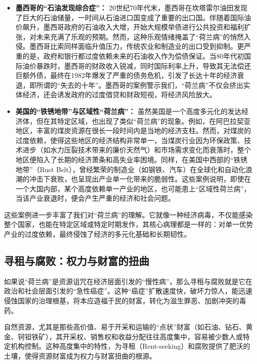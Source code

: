 \begin{itemize}
    \item \textbf{墨西哥的“石油发现综合症”：} 20世纪70年代末，墨西哥在坎塔雷尔油田发现了巨大的石油储量，一时间从石油进口国变成了重要的出口国。伴随着国际油价飙升，墨西哥政府的石油收入大增，开始大规模举债进行公共投资和福利扩张，对未来充满了乐观的预期。然而，这种乐观情绪掩盖了“荷兰病”的悄然入侵。墨西哥比索同样面临升值压力，传统农业和制造业的出口受到抑制。更严重的是，政府和银行都过度依赖未来的石油收入作为偿债保证。当80年代初国际油价暴跌时，墨西哥的财政收入锐减，同时国际利率上升，导致其无法偿还巨额外债，最终在1982年爆发了严重的债务危机，引发了长达十年的经济衰退，即所谓的“失去的十年”。墨西哥的案例警示我们，“荷兰病”不仅会挤出实体经济，还会诱发政府的过度借贷和财政短视，将经济风险放大。
    \item \textbf{美国的“铁锈地带”与区域性“荷兰病”：} 虽然美国是一个高度多元化的发达经济体，但在其特定区域，也出现了类似“荷兰病”的现象。例如，在阿巴拉契亚地区，丰富的煤炭资源在很长一段时间内是当地的经济支柱。然而，对煤炭的过度依赖，使得这些地区的经济结构非常单一，当煤炭行业因为环保政策、技术进步（如水力压裂技术带来的廉价天然气）和市场需求变化而衰落时，整个地区便陷入了长期的经济萧条和高失业率困境。同样，在美国中西部的“铁锈地带”（Rust Belt），曾经繁荣的制造业（如钢铁、汽车）在全球化和自动化浪潮的冲击下衰败，也呈现出产业单一化带来的脆弱性。这些案例说明，即使在一个大国内部，某个高度依赖单一产业的地区，也可能患上“区域性荷兰病”，当该产业衰退时，便会产生严重的经济和社会问题。
\end{itemize}

这些案例进一步丰富了我们对“荷兰病”的理解。它就像一种经济病毒，不仅能感染整个国家，也能在特定区域或特定时期发作，其核心病理都是一样的：对单一优势产业的过度依赖，最终侵蚀了经济的多元化基础和长期韧性。

\subsection*{寻租与腐败：权力与财富的扭曲}

如果说“荷兰病”是资源诅咒在经济层面引发的“慢性病”，那么寻租与腐败就是它在政治和社会层面引发的“急性癌症”。这种“癌症”扩散速度快，破坏力惊人，能迅速侵蚀国家的治理根基，将本应造福于民的财富，转化为滋生罪恶、加剧冲突的毒药。

自然资源，尤其是那些高价值、易于开采和运输的“点状”财富（如石油、钻石、黄金、钶钽铁矿），其开采权、销售权和收益分配往往高度集中，容易被少数人或特定机构控制。这种高度集中的特性，为寻租（Rent-seeking）和腐败提供了肥沃的土壤，使得资源财富成为权力与财富扭曲的根源。

